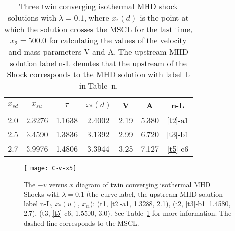 \documentclass[fleqn,usenatbib]{mnras}
\begin{document}

\begin{table}
\centering
\caption{Three twin converging isothermal MHD shock solutions with $\lambda=0.1$, where $x_{*}(d)$ is the point at which the solution crosses the MSCL for the last time, $x_{2}=500.0$ for calculating the values of the velocity and mass parameters V and A. The upstream MHD solution label n-L denotes that the upstream of the Shock corresponds to the MHD solution with label L in Table~n.}
\begin{tabular}{ccccccc}
\hline
$x_{sd}$ & $x_{su}$ & $\tau$ & $x_{*}(d)$ & V & A & n-L\\
\hline
2.0 & 2.3276 & 1.1638 & 2.4002 & 2.19 & 5.380 & \ref{t2}-a1\\
2.5 & 3.4590 & 1.3836 & 3.1392 & 2.99 & 6.720 & \ref{t3}-b1\\
2.7 & 3.9976 & 1.4806 & 3.3944 & 3.25 & 7.127 & \ref{t5}-c6\\
\hline
\end{tabular}
\label{t6}
\end{table}

\begin{figure}
\centering
\texttt{[image: C-v-x5]}
\caption{The $-v$ versus $x$ diagram of twin converging isothermal MHD Shocks with $\lambda=0.1$ (the curve label, the upstream MHD solution label n-L, $x_{*}(u)$, $x_{m}$): (t1, \ref{t2}-a1, 1.3288, 2.1), (t2, \ref{t3}-b1, 1.4580, 2.7), (t3, \ref{t5}-c6, 1.5500, 3.0). See Table~\ref{t6} for more information. The dashed line corresponds to the MSCL.}
\label{23}
\end{figure}


\end{document}
